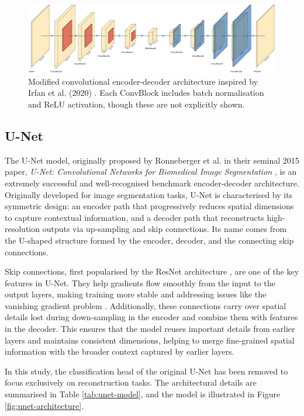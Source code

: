 \begin{figure}
    \centering
    \includegraphics[width=\linewidth]{img/ch6/architectures/irfan.pdf}
    \caption{Modified convolutional encoder-decoder architecture inspired by Irfan et al. (2020) \cite{brito-loeza_novel_2020}. Each ConvBlock includes batch normalisation and ReLU activation, though these are not explicitly shown.}
    \label{fig:irfan2020-architecture}
\end{figure}

\subsection{U-Net}

The U-Net model, originally proposed by Ronneberger et al. in their seminal 2015 paper, \textit{U-Net: Convolutional Networks for Biomedical Image Segmentation} \cite{ronneberger_u-net_2015}, is an extremely successful and well-recognised benchmark encoder-decoder architecture. Originally developed for image segmentation tasks, U-Net is characterised by its symmetric design: an encoder path that progressively reduces spatial dimensions to capture contextual information, and a decoder path that reconstructs high-resolution outputs via up-sampling and skip connections. Its name comes from the U-shaped structure formed by the encoder, decoder, and the connecting skip connections.

Skip connections, first popularised by the ResNet architecture \cite{he_deep_2015}, are one of the key features in U-Net. They help gradients flow smoothly from the input to the output layers, making training more stable and addressing issues like the vanishing gradient problem \cite{adaloglou_intuitive_2020}. Additionally, these connections carry over spatial details lost during down-sampling in the encoder and combine them with features in the decoder. This ensures that the model reuses important details from earlier layers and maintains consistent dimensions, helping to merge fine-grained spatial information with the broader context captured by earlier layers.

In this study, the classification head of the original U-Net has been removed to focus exclusively on reconstruction tasks. The architectural details are summarised in Table \ref{tab:unet-model}, and the model is illustrated in Figure \ref{fig:unet-architecture}.

